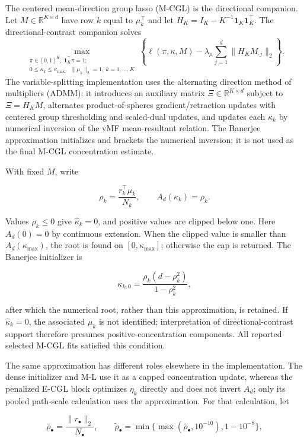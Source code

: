 \documentclass[preprint,12pt,authoryear]{elsarticle}
\begin{document}
The centered mean-direction group lasso (M-CGL) is the directional companion.
Let $M\in\mathbb R^{K\times d}$ have row $k$ equal to $\mu_k^\top$ and let
$H_K=I_K-K^{-1}\mathbf 1_K\mathbf 1_K^\top$. The directional-contrast
companion solves
\[
\max_{\substack{
\pi\in[0,1]^K,\ \mathbf 1_K^\top\pi=1;\\
0\leq\kappa_k\leq\kappa_{\max},\
\ \lVert\mu_k\rVert_2=1,\ k=1,\ldots,K
}}
\left\{
\ell(\pi,\kappa,M)
-
\lambda_\mu\sum_{j=1}^{d}
\lVert H_KM_{\cdot j}\rVert_2
\right\}.
\]
The variable-splitting implementation uses the alternating direction method
of multipliers (ADMM): it introduces an auxiliary matrix
$\Xi\in\mathbb R^{K\times d}$ subject to $\Xi=H_KM$,
alternates product-of-spheres gradient/retraction updates with centered group
thresholding and scaled-dual updates, and updates each $\kappa_k$ by numerical
inversion of the vMF mean-resultant relation. The Banerjee approximation
initializes and brackets the numerical inversion; it is not used as the final
M-CGL concentration estimate.

With fixed $M$, write

\[
\rho_k=\frac{r_k^\top\mu_k}{N_k},
\qquad
A_d(\kappa_k)=\rho_k.
\]

Values $\rho_k\leq0$ give $\widehat\kappa_k=0$, and positive values are clipped
below one. Here $A_d(0)=0$ by continuous extension. When the clipped value is
smaller than $A_d(\kappa_{\max})$, the root is found on
$[0,\kappa_{\max}]$; otherwise the cap is returned. The Banerjee initializer
\citep{banerjee2005vmf} is

\[
\kappa_{k,0}
=\frac{\rho_k(d-\rho_k^2)}{1-\rho_k^2},
\]

after which the numerical root, rather than this approximation, is retained.
If $\widehat\kappa_k=0$, the associated $\mu_k$ is not identified; interpretation
of directional-contrast support therefore presumes positive-concentration
components. All reported selected M-CGL fits satisfied this condition.

The same approximation has different roles elsewhere in the implementation.
The dense initializer and M-L use it as a capped concentration update, whereas
the penalized E-CGL block optimizes $\eta_k$ directly and does not invert
$A_d$; only its pooled path-scale calculation uses the approximation. For that
calculation, let

\[
\bar\rho_\bullet
=\frac{\lVert r_\bullet\rVert_2}{N_\bullet},
\qquad
\widetilde\rho_\bullet
=\min\{\max(\bar\rho_\bullet,10^{-10}),1-10^{-8}\},
\]
\end{document}

